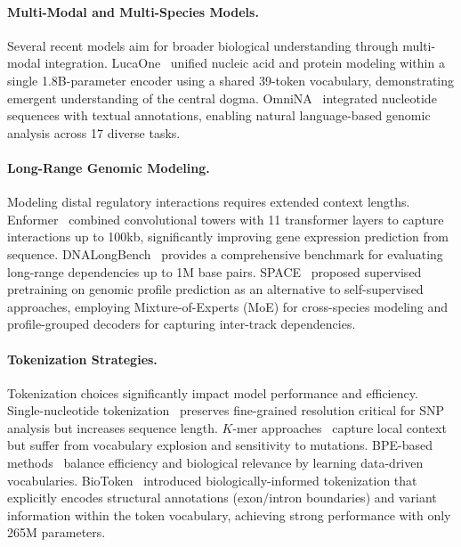 \documentclass{llmxive}
\begin{document}
\paragraph{Multi-Modal and Multi-Species Models.}
Several recent models aim for broader biological understanding through multi-modal integration. LucaOne~\citep{He2024.05.10.592927} unified nucleic acid and protein modeling within a single 1.8B-parameter encoder using a shared 39-token vocabulary, demonstrating emergent understanding of the central dogma. OmniNA~\citep{Shen2024.01.14.575543} integrated nucleotide sequences with textual annotations, enabling natural language-based genomic analysis across 17 diverse tasks.

\paragraph{Long-Range Genomic Modeling.}
Modeling distal regulatory interactions requires extended context lengths. Enformer~\citep{avsec2021enformer} combined convolutional towers with 11 transformer layers to capture interactions up to 100kb, significantly improving gene expression prediction from sequence. DNALongBench~\citep{Cheng2025.01.06.631595} provides a comprehensive benchmark for evaluating long-range dependencies up to 1M base pairs. SPACE~\citep{yang2025spacegenomicprofilepredictor} proposed supervised pretraining on genomic profile prediction as an alternative to self-supervised approaches, employing Mixture-of-Experts (MoE) for cross-species modeling and profile-grouped decoders for capturing inter-track dependencies.

\paragraph{Tokenization Strategies.}
Tokenization choices significantly impact model performance and efficiency. Single-nucleotide tokenization~\citep{nguyen2023hyenadnalongrangegenomicsequence, duan2025janusdnapowerfulbidirectionalhybrid} preserves fine-grained resolution critical for SNP analysis but increases sequence length. $K$-mer approaches~\citep{dalla2023nucleotide} capture local context but suffer from vocabulary explosion and sensitivity to mutations. BPE-based methods~\citep{zhou2024dnabert2efficientfoundationmodel, Zhou2025.01.30.635558} balance efficiency and biological relevance by learning data-driven vocabularies. BioToken~\citep{Medvedev2025.03.27.645711} introduced biologically-informed tokenization that explicitly encodes structural annotations (exon/intron boundaries) and variant information within the token vocabulary, achieving strong performance with only 265M parameters.
\end{document}
